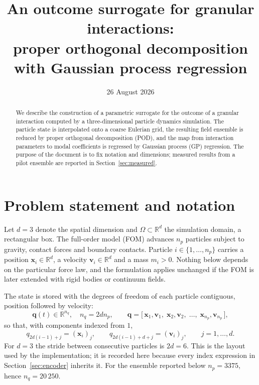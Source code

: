 \documentclass[11pt]{article}
\title{An outcome surrogate for granular interactions:\\
proper orthogonal decomposition with Gaussian process regression}
\author{}
\date{26 August 2026}
\newcommand{\R}{\mathbb{R}}
\newcommand{\bs}[1]{\boldsymbol{#1}}
\begin{document}
\maketitle

\begin{abstract}
We describe the construction of a parametric surrogate for the outcome of a granular
interaction computed by a three-dimensional particle dynamics simulation. The particle state
is interpolated onto a coarse Eulerian grid, the resulting field ensemble is reduced by
proper orthogonal decomposition (POD), and the map from interaction parameters to modal
coefficients is regressed by Gaussian process (GP) regression. The purpose of the document
is to fix notation and dimensions; measured results from a pilot ensemble are reported in
Section~\ref{sec:measured}.
\end{abstract}

\section{Problem statement and notation}
\label{sec:notation}

Let $d = 3$ denote the spatial dimension and $\Omega \subset \R^{d}$ the simulation domain,
a rectangular box. The full-order model (FOM) advances $n_p$ particles subject to gravity,
contact forces and boundary contacts. Particle $i \in \{1, \ldots, n_p\}$ carries a position
$\bs{x}_i \in \R^{d}$, a velocity $\bs{v}_i \in \R^{d}$ and a mass $m_i > 0$. Nothing below
depends on the particular force law, and the formulation applies unchanged if the FOM is
later extended with rigid bodies or continuum fields.

The state is stored with the degrees of freedom of each particle contiguous, position
followed by velocity:
\begin{equation}
  \bs{q}(t) \in \R^{n_q}, \quad n_q = 2 d n_p,
  \qquad
  \bs{q} = \big[\, \bs{x}_1, \bs{v}_1, \; \bs{x}_2, \bs{v}_2, \; \ldots, \;
  \bs{x}_{n_p}, \bs{v}_{n_p} \,\big],
  \label{eq:state}
\end{equation}
so that, with components indexed from $1$,
\begin{equation}
  q_{2d(i-1) + j} = (\bs{x}_i)_j, \qquad
  q_{2d(i-1) + d + j} = (\bs{v}_i)_j, \qquad j = 1, \ldots, d .
  \label{eq:state-index}
\end{equation}
For $d = 3$ the stride between consecutive particles is $2d = 6$. This is the layout used by
the implementation; it is recorded here because every index expression in
Section~\ref{sec:encoder} inherits it. For the ensemble reported below $n_p = 3375$, hence
$n_q = 20\,250$.
\end{document}

